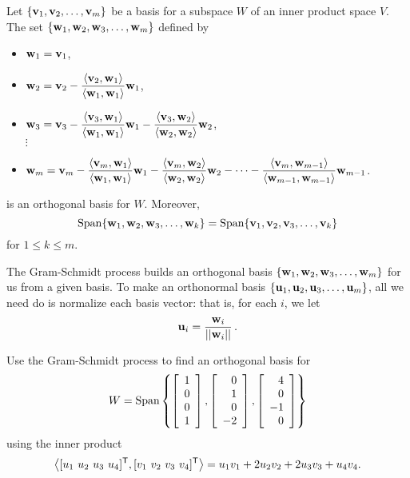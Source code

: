 \begin{theorem}\label{thm:6_d_Gram_Schmidt_ips} Let $\{\mathbf{v}_1, \mathbf{v}_2, \ldots, \mathbf{v}_m\}$ be a basis for a subspace $W$ of an inner product space $V$. The set $\{\mathbf{w}_1, \mathbf{w}_2, \mathbf{w}_3, \ldots, \mathbf{w}_{m}\}$ defined by
\begin{itemize}
\item $\mathbf{w}_1 = \mathbf{v}_1$,
\item $\mathbf{w}_2 = \mathbf{v}_2 - \displaystyle \frac{\langle \mathbf{v}_2, \mathbf{w}_1 \rangle}{\langle \mathbf{w}_1, \mathbf{w}_1 \rangle} \mathbf{w}_1$,
\item $\mathbf{w}_3 =  \mathbf{v}_3 - \displaystyle \frac{\langle \mathbf{v}_3, \mathbf{w}_1 \rangle}{\langle \mathbf{w}_1, \mathbf{w}_1 \rangle} \mathbf{w}_1 - \frac{\langle \mathbf{v}_3, \mathbf{w}_2 \rangle}{\langle \mathbf{w}_2, \mathbf{w}_2 \rangle} \mathbf{w}_2$, \\
\qquad $\vdots$
\item $\mathbf{w}_m = \mathbf{v}_m - \displaystyle \frac{\langle \mathbf{v}_m, \mathbf{w}_1 \rangle}{\langle \mathbf{w}_1, \mathbf{w}_1 \rangle} \mathbf{w}_1 - \frac{\langle \mathbf{v}_m, \mathbf{w}_2 \rangle}{\langle \mathbf{w}_2, \mathbf{w}_2 \rangle} \mathbf{w}_2 - \cdots - \frac{\langle \mathbf{v}_m, \mathbf{w}_{m-1} \rangle}{\langle \mathbf{w}_{m-1}, \mathbf{w}_{m-1} \rangle} \mathbf{w}_{m-1}$.
\end{itemize}
is an orthogonal basis for $W$. Moreover,
\[\text{Span}\{\mathbf{w}_1, \mathbf{w}_2, \mathbf{w}_3, \ldots, \mathbf{w}_{k}\} = \text{Span}\{\mathbf{v}_1,\mathbf{v}_2,\mathbf{v}_3, \ldots, \mathbf{v}_{k}\}\]
for $1\leq k\leq m$.
\end{theorem}


The Gram-Schmidt process builds an orthogonal basis $\{\mathbf{w}_1, \mathbf{w}_2, \mathbf{w}_3, \ldots, \mathbf{w}_{m}\}$ for us from a given basis. To make an orthonormal basis $\{\mathbf{u}_1, \mathbf{u}_2, \mathbf{u}_3, \ldots, \mathbf{u}_{m}\}$, all we need do is normalize each basis vector: that is, for each $i$, we let
\[\mathbf{u}_i = \displaystyle \frac{\mathbf{w}_i}{|| \mathbf{w}_i ||} \, .\]
 
\begin{activity} \label{act:6_d_gs_example} Use the Gram-Schmidt process to find an orthogonal basis for 
\[W = \text{Span} \left\{\left[ \begin{array}{c} 1\\0\\0\\1 \end{array} \right], \left[ \begin{array}{r} 0\\1\\0\\-2 \end{array} \right], \left[ \begin{array}{r} 4\\0\\-1\\0 \end{array} \right] \right\}\]
using the inner product 
\[\left\langle [u_1 \ u_2 \ u_3 \ u_4]^{\mathsf{T}}, [v_1 \ v_2 \ v_3 \ v_4]^{\mathsf{T}} \right\rangle = u_1v_1 + 2u_2v_2 + 2u_3v_3 + u_4v_4.\]	
\end{activity}


